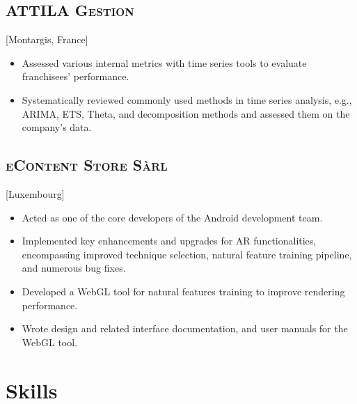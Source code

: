 \documentclass{mycv}
\begin{document}
\vspace{-\parskip}

\subsection{\large \scshape ATTILA Gestion}[Montargis, France]

\begin{positions}
\end{positions}

\begin{itemize}
  \itemsep 0em
  \item Assessed various internal metrics with time series tools to evaluate franchisees' performance.
  \item Systematically reviewed commonly used methods in time series analysis, e.g., ARIMA, ETS, Theta, and decomposition methods and assessed them on the company's data.
\end{itemize}

\vspace{-\parskip}

\subsection{\large \scshape eContent Store S\`arl}[Luxembourg]

\begin{positions}
\end{positions}

\begin{itemize}
  \itemsep 0em
  \item Acted as one of the core developers of the Android development team.
  \item Implemented key enhancements and upgrades for AR functionalities, encompassing improved technique selection, natural feature training pipeline, and numerous bug fixes.
  \item Developed a WebGL tool for natural features training to improve rendering performance.
  \item Wrote design and related interface documentation, and user manuals for the WebGL tool.
\end{itemize}


\section{Skills}
\end{document}
